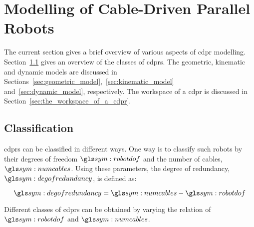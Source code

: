 \section{Modelling of Cable-Driven Parallel Robots}%
\label{sec:modelling_of_cable_driven_parallel_robots}

	The current section gives a brief overview of various aspects of \gls{cdpr}
	modelling.  Section~\ref{sec:cdpr_classification} gives an overview of the
	classes of \glspl{cdpr}. The geometric, kinematic and dynamic models are
	discussed in Sections~\ref{sec:geometric_model},~\ref{sec:kinematic_model}
	and~\ref{sec:dynamic_model}, respectively. The workspace of a \gls{cdpr} is
	discussed in Section~\ref{sec:the_workspace_of_a_cdpr}.

    \subsection{ Classification}%
    \label{sec:cdpr_classification}

		\glspl{cdpr} can be classified in different ways.	One  way  is  to
		classify such robots by their degrees of  freedom  $\robotdof$	and  the
		number of cables, $\numcables$.  Using these parameters, the  degree  of
        redundancy, $\degofredundancy$, is defined as:

        \begin{equation}
            \degofredundancy = \numcables - \robotdof
        \end{equation}

		Different classes  of  \glspl{cdpr}  can  be  obtained	by	varying  the
        relation of $\robotdof$ and $\numcables$.

